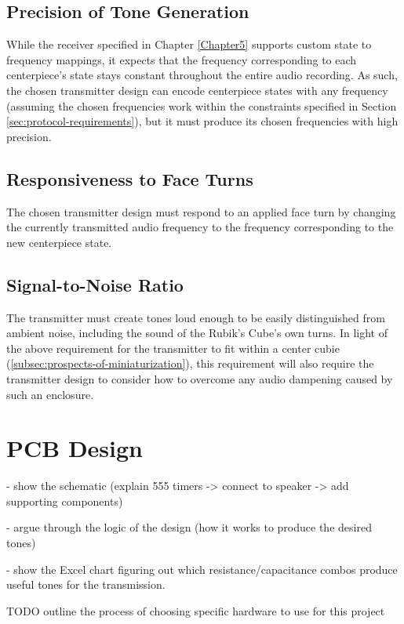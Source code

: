 \subsection{Precision of Tone Generation}
\label{subsec:precision-of-tone-generation}
While the receiver specified in Chapter \ref{Chapter5} supports custom state to frequency mappings, it expects that the frequency corresponding to each centerpiece's state stays constant throughout the entire audio recording.
As such, the chosen transmitter design can encode centerpiece states with any frequency (assuming the chosen frequencies work within the constraints specified in Section \ref{sec:protocol-requirements}), but it must produce its chosen frequencies with high precision.

\subsection{Responsiveness to Face Turns}
\label{subsec:responsiveness-to-face-turns}
The chosen transmitter design must respond to an applied face turn by changing the currently transmitted audio frequency to the frequency corresponding to the new centerpiece state.

\subsection{Signal-to-Noise Ratio}
\label{subsec:transmitter-signal-to-noise-ratio}
The transmitter must create tones loud enough to be easily distinguished from ambient noise, including the sound of the Rubik's Cube's own turns.
In light of the above requirement for the transmitter to fit within a center cubie (\ref{subsec:prospects-of-miniaturization}), this requirement will also require the transmitter design to consider how to overcome any audio dampening caused by such an enclosure.


\section{PCB Design}

 - show the schematic (explain 555 timers -> connect to speaker -> add supporting components)

 - argue through the logic of the design (how it works to produce the desired tones)

 - show the Excel chart figuring out which resistance/capacitance combos produce useful tones for the transmission.

TODO outline the process of choosing specific hardware to use for this project


